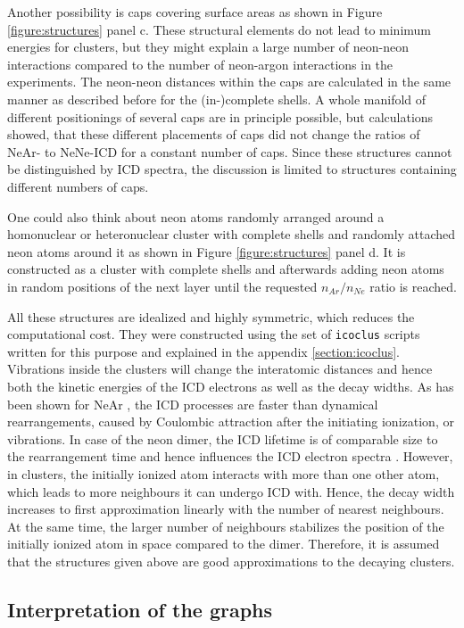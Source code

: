 Another possibility is caps covering surface areas as shown
in Figure \ref{figure:structures} panel c. These structural elements
do not lead to minimum energies for clusters, but they might explain a
large number of neon-neon interactions compared to the number of
neon-argon interactions in the experiments.
The neon-neon distances within the caps are
calculated in the same
manner as described before for the (in-)complete shells.
A whole manifold of different positionings of several caps are in principle
possible, but calculations showed, that these different
placements of caps did not change the ratios of NeAr- to NeNe-ICD for a
constant number of caps. Since these structures cannot be distinguished
by ICD spectra, the
discussion is limited to structures containing different numbers of caps.

One could also think about neon atoms randomly arranged around a homonuclear
or heteronuclear cluster with complete shells and randomly attached neon
atoms around it as shown in Figure \ref{figure:structures} panel d.
It is constructed as a cluster with complete shells and afterwards adding
neon atoms in random positions of the next layer until the requested
$n_{Ar}/n_{Ne}$ ratio is reached.

All these structures are idealized and highly symmetric, which reduces
the computational cost. They were constructed using the set of \verb|icoclus|
scripts written for this purpose and explained in the
appendix \ref{section:icoclus}.
Vibrations inside the clusters will change the interatomic
distances and hence both the kinetic energies of the ICD electrons as well as
the decay widths. As has been shown for NeAr \cite{Scheit06}, the ICD processes
are faster than dynamical rearrangements, caused by Coulombic attraction
after the initiating ionization, or vibrations. In case of the neon dimer, the
ICD lifetime is of comparable size to the rearrangement time and hence
influences the ICD electron spectra \cite{Scheit03}. However, in clusters, the
initially ionized atom interacts with more than one other atom, which leads
to more neighbours it can undergo ICD with. Hence, the decay width increases
to first approximation linearly with the number of nearest neighbours.
At the same time, the larger number of neighbours stabilizes the position
of the initially ionized atom in space compared to the dimer.
Therefore, it is assumed that the structures given above are good
approximations to the decaying clusters.




\subsection{Interpretation of the graphs}

